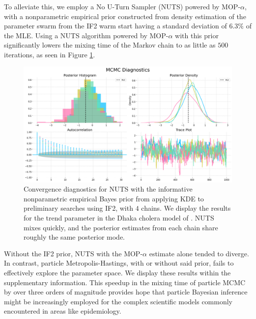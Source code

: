 \documentclass[9pt,twocolumn,pnasresearcharticle]{pnas-new}
\newcommand\arxiv[2]{#2} %
\begin{document}
To alleviate this, we employ a No U-Turn Sampler (NUTS) \cite{homan14} powered by MOP-$\alpha$, with a nonparametric empirical prior constructed from density estimation of the parameter swarm from the IF2 warm start having a standard deviation of $6.3\%$ of the MLE. 
Using a NUTS algorithm powered by MOP-$\alpha$ with this prior significantly lowers the mixing time of the Markov chain to as little as $500$ iterations, as seen in Figure \ref{fig:nuts-eb}. 

\begin{figure}[t!]
    \centering
    \includegraphics[width=\arxiv{\textwidth/\real{1.25}}{\textwidth/\real{2.5}}]{imgs/pmcmc/nuts_eb.png}
    \arxiv{}{\vspace*{-1mm}}
    \caption{Convergence diagnostics for NUTS with the informative nonparametric empirical Bayes prior from applying KDE to preliminary searches using IF2, with $4$ chains. We display the results for the trend parameter in the Dhaka cholera model of \cite{king08}. NUTS mixes quickly, and the posterior estimates from each chain share roughly the same posterior mode.}
    \label{fig:nuts-eb}
    \arxiv{}{\vspace*{-4mm}}
\end{figure}

Without the IF2 prior, NUTS with the MOP-$\alpha$ estimate alone tended to diverge.
In contrast, particle Metropolis-Hastings, with or without said prior, fails to effectively explore the parameter space.
We display these results \arxiv{in Figures \ref{fig:mh} and \ref{fig:nuts} in Appendix~\ref{appendix:bayes}}{within the supplementary information}. 
This speedup in the mixing time of particle MCMC by over three orders of magnitude provides hope that particle Bayesian inference might be increasingly employed for the complex scientific models commonly encountered in areas like epidemiology.
\end{document}
